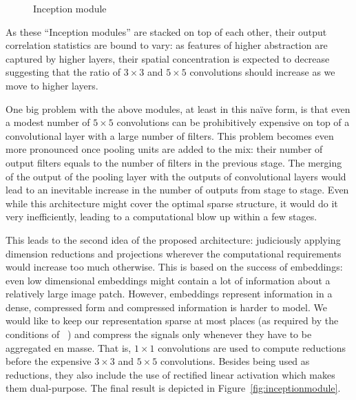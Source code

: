 \begin{figure}
\centering
{}
\caption{Inception module}
\label{fig:inception}
\end{figure}

As these ``Inception modules'' are stacked on top of each other, their output correlation statistics are bound to vary: as features of higher abstraction are captured by higher layers, their spatial concentration is expected to decrease suggesting that the ratio of $3{\times}3$ and $5{\times}5$ convolutions should increase as we move to higher layers. 

One big problem with the above modules, at least in this na\"{i}ve form, is that even a modest number of $5{\times}5$ convolutions can be prohibitively expensive on top of a convolutional layer with a large number of filters. This problem becomes even more pronounced once pooling units are added to the mix: their number of output filters equals to the number of filters in the previous stage. The merging of the output of the pooling layer with the outputs of convolutional layers would lead to an inevitable increase in the number of outputs from stage to stage. Even while this architecture might cover the optimal sparse structure, it would do it very inefficiently, leading to a computational blow up within a few stages. 

This leads to the second idea of the proposed architecture: judiciously applying dimension reductions and projections wherever the computational requirements would increase too much otherwise. This is based on the success of embeddings: even low dimensional embeddings might contain a lot of information about a relatively large image patch. However, embeddings represent information in a dense, compressed form and compressed information is harder to model. We would like to keep our representation sparse at most places (as required by the conditions of ~\cite{arora2013bounds}) and compress the signals only whenever they have to be aggregated en masse. That is, $1{\times}1$ convolutions are used to compute reductions before the expensive $3{\times}3$ and $5{\times}5$ convolutions. Besides being used as reductions, they also include the use of rectified linear activation which makes them dual-purpose. The final result is depicted in Figure~\ref{fig:inceptionmodule}.

